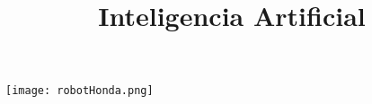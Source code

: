 \documentclass[spanish, a4paper, 12pt]{article} 	%
\begin{document}
\title{\textbf{Inteligencia Artificial}}
\maketitle
\texttt{[image: robotHonda.png]}
\end{document}
